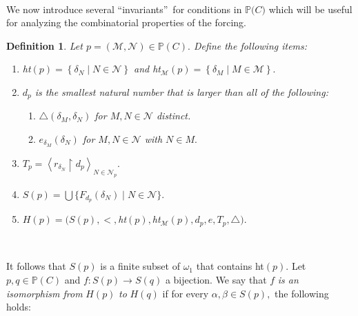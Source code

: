 \documentclass{article}
\newtheorem{definition}[theorem]{Definition}
\begin{document}
\qquad\ \qquad\ 

We now introduce several \textquotedblleft invariants\textquotedblright\ for
conditions in $\mathbb{P(}C\mathbb{)}$ which will be useful for analyzing the
combinatorial properties of the forcing.

\begin{definition}
Let $p=(\mathcal{M},\mathcal{N})\in\mathbb{P}\left(  C\right)  .$ Define the
following items:

\begin{enumerate}
\item \textsf{ht}$\left(  p\right)  =\left\{  \delta_{N}\mid N\in
\mathcal{N}\right\}  $ and \textsf{ht}$_{\mathcal{M}}\left(  p\right)
=\left\{  \delta_{M}\mid M\in\mathcal{M}\right\}  .$

\item $d_{p}$ is the smallest natural number that is larger than all of the following:

\begin{enumerate}
\item $\triangle(\delta_{M},\delta_{N})$ for $M,N\in\mathcal{N}$ distinct.

\item $e_{\delta_{M}}(\delta_{N})$ for $M,N\in\mathcal{N}$ with $N\in M.$
\end{enumerate}

\item $T_{p}=\left\langle r_{\delta_{N}}\upharpoonright d_{p}\right\rangle
_{N\in\mathcal{N}_{p}}.$

\item $S\left(  p\right)  =\bigcup\{F_{d_{p}}\left(  \delta_{N}\right)  \mid
N\in\mathcal{N}\}.$

\item $H\left(  p\right)  =(S\left(  p\right)  ,<,$\textsf{ht}$\left(
p\right)  ,$\textsf{ht}$_{\mathcal{M}}\left(  p\right)  ,d_{p},e,T_{p}%
,\triangle).$
\end{enumerate}
\end{definition}

\qquad\ \qquad\ \ \ 

It follows that $S\left(  p\right)  $ is a finite subset of $\omega_{1}$ that
contains \textsf{ht}$\left(  p\right)  .$ Let $p,q\in\mathbb{P}\left(
C\right)  $ and $f:S\left(  p\right)  \longrightarrow S\left(  q\right)  $ a
bijection. We say that $f$ \emph{is an isomorphism from }$H\left(  p\right)
$\emph{ to} $H\left(  q\right)  $ if for every $\alpha,\beta\in S\left(
p\right)  ,$ the following holds:
\end{document}
